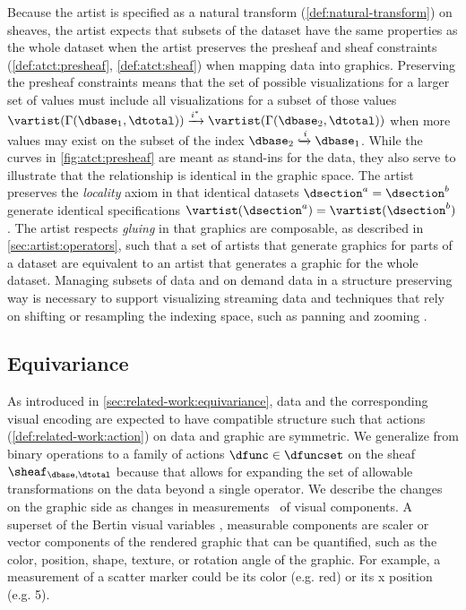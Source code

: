 \documentclass[review]{vgtc}
\theoremstyle{definition}
\theoremstyle{remark}
\begin{document}
Because the artist is specified as a natural transform (\autoref{def:natural-transform}) on sheaves, the artist expects that subsets of the dataset have the same properties as the whole dataset when the artist preserves the presheaf and sheaf constraints (\autoref{def:atct:presheaf}, \autoref{def:atct:sheaf}) when mapping data into graphics. Preserving the presheaf constraints means that the set of possible visualizations for a larger set of values must include all visualizations for a subset of those values  $\vartist(\Gamma(\dbase_1, \dtotal)) \xrightarrow{i^*} \vartist(\Gamma(\dbase_2, \dtotal))$ when more values may exist on the subset of the index $\dbase_2 \xhookrightarrow{i} \dbase_1$. While the curves in \autoref{fig:atct:presheaf} are meant as stand-ins for the data, they also serve to illustrate that the relationship is identical in the graphic space. The artist preserves the \textit{locality} axiom in that identical datasets $\dsection^{a} = \dsection^{b}$ generate identical specifications $\vartist(\dsection^a) = \vartist(\dsection^b)$. The artist respects \textit{gluing} in that graphics are composable, as described in \autoref{sec:artist:operators}, such that a set of artists that generate graphics for parts of a dataset are equivalent to an artist that generates a graphic for the whole dataset. Managing subsets of data and on demand data in a structure preserving way is necessary to support visualizing streaming data \cite{krstajicVisualizationStreamingData2013} and techniques that rely on shifting or resampling the indexing space, such as  panning and zooming \cite{NekrasovskiEvaluationPanZoom2006}.

\subsection{Equivariance}
\label{sec:artist:equiv}
As introduced in \autoref{sec:related-work:equivariance}, data and the corresponding visual encoding are expected to have compatible structure such that actions (\autoref{def:related-work:action}) on data and graphic are symmetric. We generalize from binary operations to a family of actions $\dfunc \in \dfuncset$ on the sheaf $\sheaf_{\dbase, \dtotal}$ because that allows for expanding the set of allowable transformations on the data beyond a single operator. We describe the changes on the graphic side as changes in \textcolor{monoid}{measurements} \measurec\ of visual components. A superset of the Bertin visual variables \cite{bertinIIPropertiesGraphic2011}, measurable components are scaler or vector components of the rendered graphic that can be quantified, such as the color, position, shape, texture, or rotation angle of the graphic. For example, a measurement of a scatter marker could be its color (e.g. red) or its x position (e.g. 5).
\end{document}
